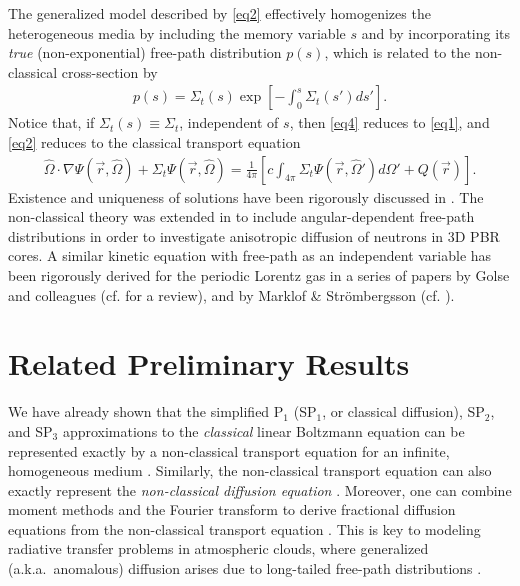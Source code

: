 \documentclass[12pt]{article}
\newcommand{\rvec}{\ensuremath{\vec{r}}}
\newcommand{\omvec}{\ensuremath{\hat{\Omega}}}
\begin{document}
The generalized model described by \cref{eq2} effectively homogenizes the heterogeneous media by including the memory variable $s$ and by incorporating its \textit{true} (non-exponential) free-path distribution $p(s)$, which is related to the non-classical cross-section by \cite{larvas11}
\begin{align}\label{eq4}
p(s) = \Sigma_t(s)\exp\left[-\int_0^s\Sigma_t(s')ds'\right].
\end{align}
Notice that, if $\Sigma_t(s)\equiv\Sigma_t$, independent of $s$, then \cref{eq4} reduces to \cref{eq1}, and \cref{eq2} reduces to the classical transport equation
\begin{align}\label{eq5}
\omvec\cdot\nabla\Psi(\rvec,\omvec) + \Sigma_t\Psi(\rvec,\omvec)
= \frac{1}{4\pi}\left[c\int_{4\pi} \Sigma_t\Psi(\rvec,\omvec')d\Omega' + Q(\rvec)\right].\nonumber
\end{align}
Existence and uniqueness of solutions have been rigorously discussed in \cite{fragou10}.
The non-classical theory was extended in \cite{vaslar14a} to include angular-dependent free-path distributions in order to investigate anisotropic diffusion of neutrons in 3D PBR cores.
A similar kinetic equation with free-path as an independent variable has been rigorously derived for the periodic Lorentz gas in a series of papers by Golse and colleagues (cf. \cite{gol12} for a review), and by Marklof \& Str\"ombergsson (cf. \cite{marstr11,marstr15}).

\section{Related Preliminary Results}

We have already shown that the simplified P$_1$ (SP$_1$, or classical diffusion), SP$_2$, and SP$_3$ approximations to the \textit{classical} linear Boltzmann equation can be represented exactly by a non-classical transport equation for an infinite, homogeneous medium \cite{frakry15}.
Similarly, the non-classical transport equation can also exactly represent the  \textit{non-classical diffusion equation} \cite{vas16}.
Moreover, one can combine moment methods and the Fourier transform to derive fractional diffusion equations from the non-classical transport equation \cite{frasun16}.
This is key to modeling radiative transfer problems in atmospheric clouds, where generalized (a.k.a.\ anomalous) diffusion arises due to long-tailed free-path distributions \cite{davmar97,schetal06}.
\end{document}
